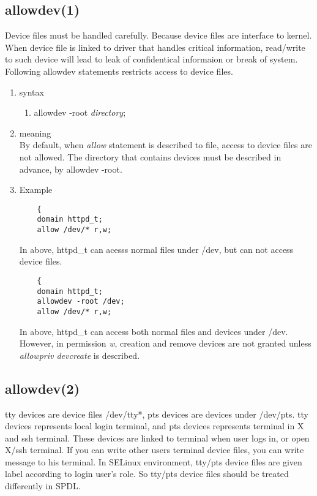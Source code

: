 \documentclass{article}
\begin{document}
\subsection{allowdev(1)}
 Device files must be handled carefully. Because device files are
interface to kernel. When device file is linked to driver that handles
critical information, read/write to such device will lead to leak of
confidentical informaion or break of system. Following allowdev
statements restricts access to device files.
\begin{enumerate}
 \item syntax
      \begin{enumerate}
       \item allowdev -root {\it directory};
      \end{enumerate}
 \item meaning\\
	By default, when {\it allow} statement is described to file,
	access to device files are not allowed. The directory that
	contains devices must be described in advance, by allowdev
	-root.

 \item Example\\
       \begin{verbatim}
	{ 
	domain httpd_t;
	allow /dev/* r,w;
       \end{verbatim}
       In above, httpd\_t can acesss normal files under /dev, but can
       not access device files.
       \begin{verbatim}
	{ 
	domain httpd_t;
	allowdev -root /dev;
	allow /dev/* r,w;
       \end{verbatim}
       In above, httpd\_t can access both normal files and devices under
       /dev.
       However, in permission {\it w}, creation and remove devices are not granted unless {\it allowpriv devcreate } is described. 
\end{enumerate}

\subsection{allowdev(2)}
tty devices are device files /dev/tty*, pts devices are devices under
/dev/pts. tty devices represents local login terminal, and pts devices
represents terminal in X and ssh terminal. These devices are linked to
terminal when user logs in, or open X/ssh terminal. If you can write
other users terminal device files, you can write message to his
terminal. 
In SELinux environment, tty/pts device files are given label according to
login user's role. 
So tty/pts device files should be treated differently in SPDL.
\end{document}
